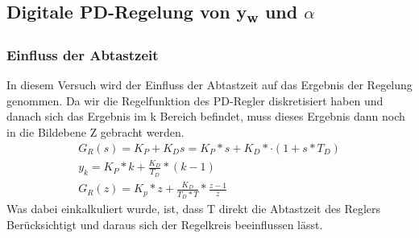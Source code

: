 \documentclass[10pt]{scrartcl}
\begin{document}
\subsection{Digitale PD-Regelung von  y\textsubscript{w} und $\alpha$}
\subsubsection{Einfluss der Abtastzeit}
In diesem Versuch wird der Einfluss der Abtastzeit auf das Ergebnis der Regelung genommen. Da wir die Regelfunktion des PD-Regler diskretisiert haben und danach sich das Ergebnis im k Bereich befindet, muss dieses Ergebnis dann noch in die Bildebene Z gebracht werden. 
\begin{align}
   G_R(s) = K_P + K_D s = K_P *s + K_D *·(1 + s *T_D)  \\
   y_k= K_P * k+ \frac{K_D}{T_D} *( k - 1 )  \\
   G_R(z) = K_p * z + \frac{K_D}{T_D*T} *\frac{z-1}{z}
\end{align}
Was dabei einkalkuliert wurde, ist, dass T direkt die Abtastzeit des Reglers Berücksichtigt und daraus sich der Regelkreis beeinflussen lässt.
\end{document}
